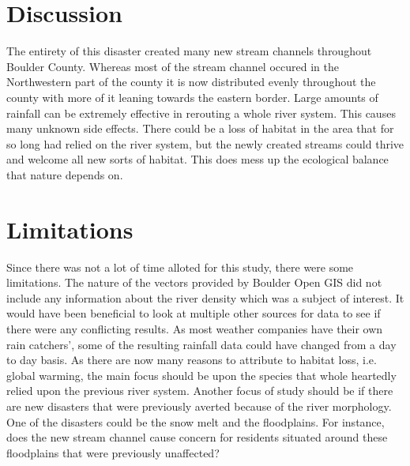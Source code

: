 \documentclass[twoside]{article}
\begin{document}
\begin{multicols}{2}

\section{Discussion}

The entirety of this disaster created many new stream channels throughout Boulder County. Whereas most of the stream channel occured in the Northwestern part of the county it is now distributed evenly throughout the county with more of it leaning towards the eastern border. Large amounts of rainfall can be extremely effective in rerouting a whole river system. This causes many unknown side effects. There could be a loss of habitat in the area that for so long had relied on the river system, but the newly created streams could thrive and welcome all new sorts of habitat. This does mess up the ecological balance that nature depends on.


\section{Limitations}

Since there was not a lot of time alloted for this study, there were some limitations. The nature of the vectors provided by Boulder Open GIS did not include any information about the river density which was a subject of interest. It would have been beneficial to look at multiple other sources for data to see if there were any conflicting results. As most weather companies have their own rain catchers', some of the resulting rainfall data could have changed from a day to day basis.  As there are now many reasons to attribute to habitat loss, i.e. global warming, the main focus should be upon the species that whole heartedly relied upon the previous river system. Another focus of study should be if there are new disasters that were previously averted because of the river morphology. One of the disasters could be the snow melt and the floodplains. For instance, does the new stream channel cause concern for residents situated around these floodplains that were previously unaffected?


\end{multicols}
\end{document}
